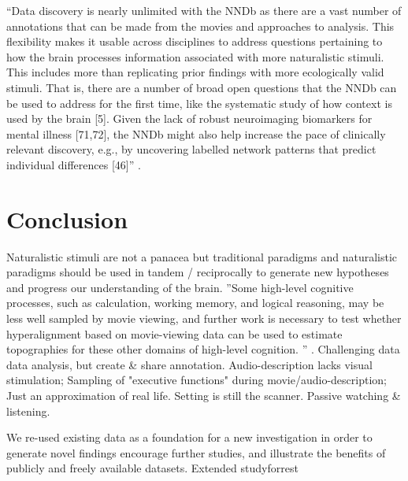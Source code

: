 ``Data discovery is nearly unlimited with the NNDb as there are a vast number of
annotations that can be made from the movies and approaches to analysis.
%
This flexibility makes it usable across disciplines to address questions
pertaining to how the brain processes information associated with more
naturalistic stimuli.
%
This includes more than replicating prior findings with more ecologically valid
stimuli.
%
That is, there are a number of broad open questions that the NNDb can be used to
address for the first time, like the systematic study of how context is used by
the brain [5].
%
Given the lack of robust neuroimaging biomarkers for mental illness [71,72], the
NNDb might also help increase the pace of clinically relevant discovery, e.g.,
by uncovering labelled network patterns that predict individual differences
[46]'' \citep{aliko2020naturalistic}.



\section{Conclusion}



%
Naturalistic stimuli are not a panacea but traditional paradigms and
naturalistic paradigms should be used in tandem / reciprocally to generate new
hypotheses and progress our understanding of the brain.
%
''Some high-level cognitive processes, such as calculation, working memory, and
logical reasoning, may be less well sampled by movie viewing, and further work
is necessary to test whether hyperalignment based on movie-viewing data can be
used to estimate topographies for these other domains of high-level cognition.
'' \citep{jiahui2020predicting}.
%
Challenging data data analysis, but create \& share annotation.
%
Audio-description lacks visual stimulation; Sampling of "executive functions"
during movie/audio-description;
%
Just an approximation of real life.
%
Setting is still the scanner.
%
Passive watching \& listening.

%
We re-used existing data as a foundation for a new investigation in
order to generate novel findings encourage further studies, and illustrate the
benefits of publicly and freely available datasets.
%
Extended studyforrest

